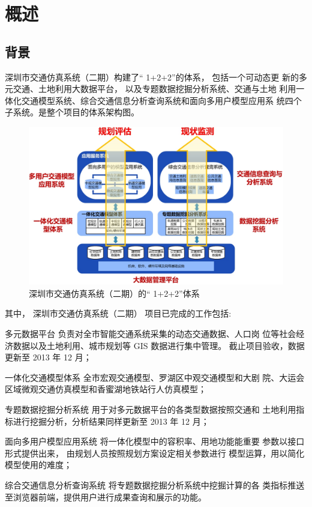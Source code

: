 

\chapter{概述}

\section{背景} 
深圳市交通仿真系统（二期）构建了“ 1+2+2”的体系， 包括一个可动态更
新的多元交通、土地利用大数据平台， 以及专题数据挖掘分析系统、交通与土地
利用一体化交通模型系统、综合交通信息分析查询系统和面向多用户模型应用系
统四个子系统。是整个项目的体系架构图。

\begin{figure}[!hbt]
  \centering
  \includegraphics[width=\textwidth]{figures/chp01_项目体系架构.jpg}
  \caption{深圳市交通仿真系统（二期）的“ 1+2+2”体系\label{fig:项目体系架构}}
\end{figure}

其中， 深圳市交通仿真系统（二期） 项目已完成的工作包括:

\begin{para}
\item[多元数据平台] 负责对全市智能交通系统采集的动态交通数据、人口岗
位等社会经济数据以及土地利用、城市规划等 GIS 数据进行集中管理。
截止项目验收，数据更新至 2013 年 12 月；
\item[一体化交通模型体系] 全市宏观交通模型、罗湖区中观交通模型和大剧
院、大运会区域微观交通仿真模型和香蜜湖地铁站行人仿真模型；
\item[专题数据挖掘分析系统] 用于对多元数据平台的各类型数据按照交通和
土地利用指标进行挖掘分析，分析结果同样更新至 2013 年 12 月；
\item[面向多用户模型应用系统] 将一体化模型中的容积率、用地功能能重要
参数以接口形式提供出来， 由规划人员按照规划方案设定相关参数进行
模型运算，用以简化模型使用的难度；
\item[综合交通信息分析查询系统] 将专题数据挖掘分析系统中挖掘计算的各
类指标推送至浏览器前端，提供用户进行成果查询和展示的功能。
\end{para}

